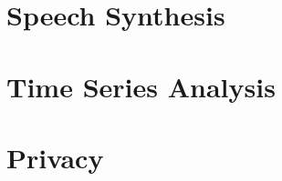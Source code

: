 \documentclass[11pt,fleqn]{book} %
\begin{document}
%

\part{Speech Synthesis}




%

\part{Time Series Analysis}




%

\part{Privacy}



\end{document}
